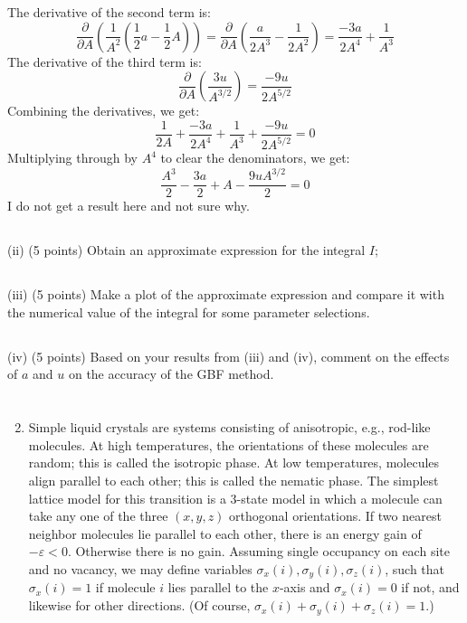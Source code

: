 \documentclass[12pt]{article}
\begin{document}
The derivative of the second term is:
\begin{equation}
\frac{\partial}{\partial A} \left(\frac{1}{A^2} \left(\frac{1}{2} a - \frac{1}{2} A\right)\right) = \frac{\partial}{\partial A} \left(\frac{a}{2A^3} - \frac{1}{2A^2} \right) = \frac{-3a}{2A^4} + \frac{1}{A^3}
\end{equation}
The derivative of the third term is:
\begin{equation}
\frac{\partial}{\partial A} \left(\frac{3u}{A^{3/2}}\right) = \frac{-9u}{2A^{5/2}}
\end{equation}
Combining the derivatives, we get:
\begin{equation}
\frac{1}{2A} + \frac{-3a}{2A^4} + \frac{1}{A^3} + \frac{-9u}{2A^{5/2}} = 0
\end{equation}
Multiplying through by $A^4$ to clear the denominators, we get:
\begin{equation}
\frac{A^3}{2} - \frac{3a}{2} + A - \frac{9uA^{3/2}}{2} = 0
\end{equation}
I do not get a result here and not sure why.
\subsection{}
(ii) (5 points) Obtain an approximate expression for the integral $I$;
\subsection{}
(iii) (5 points) Make a plot of the approximate expression and compare it with the numerical value of the integral for some parameter selections.
\subsection{}
(iv) (5 points) Based on your results from (iii) and (iv), comment on the effects of $a$ and $u$ on the accuracy of the GBF method.
\section{}
\begin{enumerate}
  \setcounter{enumi}{1}
  \item Simple liquid crystals are systems consisting of anisotropic, e.g., rod-like molecules. At high temperatures, the orientations of these molecules are random; this is called the isotropic phase. At low temperatures, molecules align parallel to each other; this is called the nematic phase. The simplest lattice model for this transition is a 3-state model in which a molecule can take any one of the three $(x, y, z)$ orthogonal orientations. If two nearest neighbor molecules lie parallel to each other, there is an energy gain of $-\varepsilon<0$. Otherwise there is no gain. Assuming single occupancy on each site and no vacancy, we may define variables $\sigma_{x}(i), \sigma_{y}(i), \sigma_{z}(i)$, such that $\sigma_{x}(i)=1$ if molecule $i$ lies parallel to the $x$-axis and $\sigma_{x}(i)=0$ if not, and likewise for other directions. (Of course, $\sigma_{x}(i)+\sigma_{y}(i)+\sigma_{z}(i)=1$.)
\end{enumerate}
\end{document}
